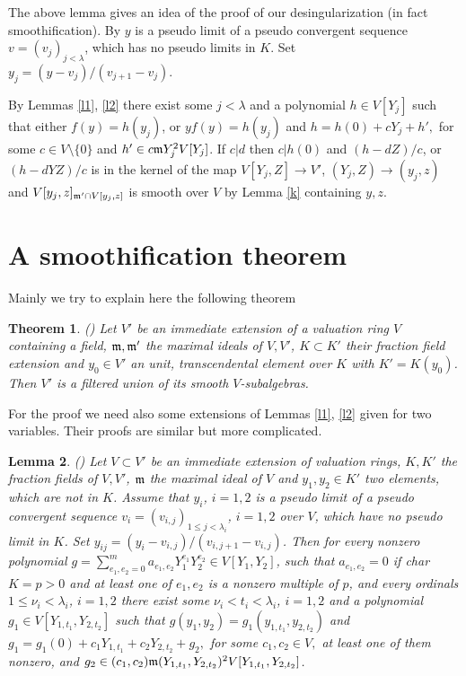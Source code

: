 \documentclass[12pt]{amsart}
\def\frk{\frak}               %
\def\mm{{\frk m}}
\let\to=\rightarrow
\newtheorem{Theorem}{Theorem}[]
\newtheorem{Lemma}[Theorem]{Lemma}
\theoremstyle{definition}
\theoremstyle{subsection-tweak}
\theoremstyle{theorem}
\theoremstyle{definition}
\begin{document}
The above lemma gives an  idea of the proof of our  desingularization (in fact smoothification).
By \cite[Theorem 1]{Kap}  $y$ is a pseudo limit of a pseudo convergent sequence $v=(v_j)_{j<\lambda}$, which 
 has no pseudo limits in $K$.  Set $y_j=(y-v_j)/(v_{j+1}-v_j)$.


 By Lemmas \ref{l1}, \ref{l2} there exist some  $j<\lambda$ and a polynomial $h\in V[Y_j]$ such that either 
$f(y)=h(y_j)$, or $y f(y)=h(y_j)$
 and  $h=h(0)+c  Y_j+h',$
for some   $c\in V\setminus \{0\}$ and $h'\in  c\mm Y_j^2 V[Y_j]$.   If $c|d$ then $c|h(0)$ and $(h-dZ)/c$, or $(h-dYZ)/c$ is in the kernel of the map $V[Y_j,Z]\to V'$,
$(Y_j,Z)\to (y_j,z)$ and  $V[y_j,z]_{\mm'\cap V[y_j,z]}$ is smooth over $V$ by Lemma \ref{k} containing  $y,z$. 




\section{A smoothification theorem}

Mainly we try to explain here the following theorem

\begin{Theorem}(\cite[Theorem 23]{P3}) \label{T4}
 Let  $ V'$ be an  immediate extension  of a valuation ring $V$ containing a field, $\mm, \mm'$ the maximal ideals of $V,V'$, $K\subset K'$ their fraction field extension and $y_0\in V'$ an unit, transcendental element over $K$ with $K'=K(y_0)$. 
  Then $V'$ is  a filtered  union of its  smooth  $V$-subalgebras.
\end{Theorem}

For the proof we need also some extensions of Lemmas \ref{l1}, \ref{l2} given for two variables. Their proofs are similar but  more complicated.

\begin{Lemma}(\cite[Proposition 18]{P3}) \label{l4}
Let $V \subset V'$ be an  immediate extension of valuation rings,  $K, K'$ the fraction fields of $V, V'$, $\mm$ the maximal ideal of $V$ and  $y_1,y_2\in K'$ two elements,  which are not in $K$. Assume that $y_i$, $i=1,2$ is  a pseudo limit of a pseudo convergent sequence $v_i=(v_{i,j})_{1\leq j<\lambda_i}$, $i=1,2$ over $V$, which   have no pseudo limit in $K$.
 Set $y_{ij}=(y_i-v_{i,j})/(v_{i,j+1}-v_{i,j})$.
Then for every nonzero polynomial   $g=\sum_{e_1,e_2=0}^m a_{e_1,e_2} Y_1^{e_1} Y_2^{e_2} \in V[Y_1,Y_2]$, such that $a_{e_1,e_2}=0$ if char\ $K=p>0$ and at least one of $e_1,e_2$ is a nonzero multiple of  $p$,  and every ordinals $1\leq \nu_i<\lambda_i$,  $i=1,2$  there exist some  $\nu_i<t_i<\lambda_i$, $i=1,2$ and a polynomial $g_1\in V[Y_{1,t_1},Y_{2,t_2}]$ such that 
$g(y_1,y_2)=g_1(y_{1,t_1},y_{2,t_2})$
 and  $g_1=g_1(0)+c_1  Y_{1,t_1}+c_2 Y_{2,t_2}+g_2,$
for some   $c_1,c_2\in V, $ at least one of them nonzero, and $g_2\in  (c_1,c_2)\mm (Y_{1,t_1},Y_{2,t_2})^2 V[Y_{1,t_1},Y_{2,t_2}]$.   
\end{Lemma}
\end{document}
